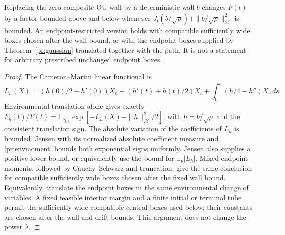 \begin{lemma}\label{pr:wall}
Replacing the zero composite OU wall by a deterministic wall $b$ changes
$F(t)$ by a factor bounded above and below whenever
$J_t(b/\sqrt\rho)+\|b/\sqrt\rho\|_{\mathcal H}^2$ is bounded.
An endpoint-restricted version holds with compatible sufficiently wide
boxes chosen after the wall bound, or with the endpoint boxes supplied
by Theorem~\ref{pr:gaussian} translated together with the path.
It is not a statement for arbitrary prescribed unchanged endpoint boxes.
\end{lemma}
\begin{proof}
The Cameron--Martin linear functional is
\[
 L_h(X)=(h(0)/2-h'(0))X_0+(h'(t)+h(t)/2)X_t
                   +\int_0^t(h/4-h'')X_s\,ds.
\]
Environmental translation alone gives exactly
$F_b(t)/F(t)=\mathbb E_{\nu_{t,\lambda}}
\exp[-L_h(X)-\|h\|_{\mathcal H}^2/2]$, with $h=b/\sqrt\rho$ and the
consistent translation sign. The absolute variation of the coefficients
of $L_h$ is bounded. Jensen with its normalized absolute coefficient
measure and \eqref{pr:envmoment} bounds both exponential signs uniformly.
Jensen also supplies a positive lower bound, or equivalently use the
bound for $\mathbb E_{\nu}|L_h|$. Mixed endpoint moments, followed by
Cauchy--Schwarz and truncation, give the same conclusion for compatible
sufficiently wide boxes chosen after the fixed wall bound. Equivalently,
translate the endpoint
boxes in the same environmental change of variables. A fixed feasible
interior margin and a finite initial or terminal tube permit the
sufficiently wide compatible central boxes used below; their constants
are chosen after the wall and drift bounds.
This argument does not change the power $\lambda$.
\end{proof}

